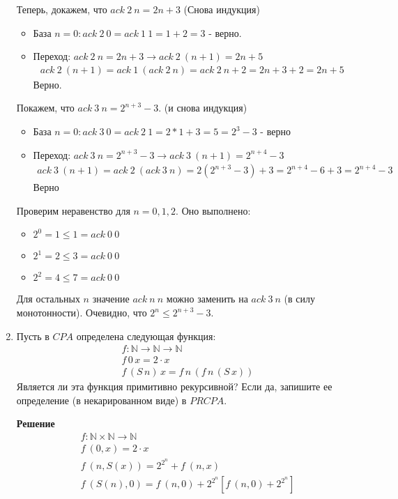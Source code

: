 \begin{enumerate}
Теперь, докажем, что $ack \ 2 \ n = 2 n + 3$ (Снова индукция)
\begin{itemize}
	\item База $n = 0 : ack \ 2 \ 0 = ack \ 1 \ 1 = 1 + 2 = 3$ - верно.
	\item Переход: $ack \ 2 \ n = 2 n + 3 \to ack \ 2 \ (n + 1) = 2 n + 5$
	\begin{align*}
		ack \ 2 \ (n + 1) = ack \ 1 \ (ack \ 2 \ n) = ack \ 2 \ n + 2 = 2 n + 3 + 2 = 2 n + 5
	\end{align*}
	Верно.
\end{itemize}

Покажем, что $ack \ 3 \ n = 2 ^ {n + 3} - 3$. (и снова индукция)
\begin{itemize}
	\item База $n = 0 : ack \ 3 \ 0  = ack \ 2 \ 1 = 2 * 1 + 3 = 5 = 2^3 - 3$ - верно
	\item Переход: $ack \ 3 \ n = 2 ^ {n + 3} - 3 \to ack \ 3 \ (n + 1) = 2 ^ {n + 4} - 3$
	\begin{align*}
		ack \ 3 \ (n + 1) = ack \ 2 \ (ack \ 3 \ n) = 2 (2 ^ {n + 3} - 3) + 3 = 2 ^ {n + 4} - 6 + 3 = 2 ^ {n + 4} - 3
	\end{align*}
	Верно
\end{itemize}

Проверим неравенство для $n = 0, 1, 2$. Оно выполнено:
\begin{itemize}
	\item $2^0 = 1 \le 1 = ack\ 0 \ 0$
	\item $2^1 = 2 \le 3 = ack\ 0 \ 0$
	\item $2^2 = 4 \le 7 = ack\ 0 \ 0$
\end{itemize}

Для остальных $n$ значение $ack \ n \ n$ можно заменить на $ack \ 3 \ n$ (в силу монотонности). 
Очевидно, что $2^n \le 2^{n + 3} - 3$. 

\item Пусть в $CPA$ определена следующая функция:
\begin{align*}
& f : \mathbb{N} \to \mathbb{N} \to \mathbb{N} \\
& f\,0\,x = 2 \cdot x \\
& f\,(S\,n)\,x = f\,n\,(f\,n\,(S\,x))
\end{align*}
Является ли эта функция примитивно рекурсивной? Если да, запишите ее определение (в некарированном виде) в 
$PRCPA$.

\textbf{Решение}
\begin{align*}
& f : \mathbb{N} \times \mathbb{N} \to \mathbb{N} \\
& f \ (0,x) = 2 \cdot x \\
& f \ (n, S(x)) = 2 ^ {2 ^ n} + f \ (n, x) \\
& f \ (S(n), 0) = f \ (n, 0) + 2 ^ {2 ^ n} \left[ f \ (n, 0) + 2 ^ {2 ^ n}\right]
\end{align*}


\end{enumerate}
